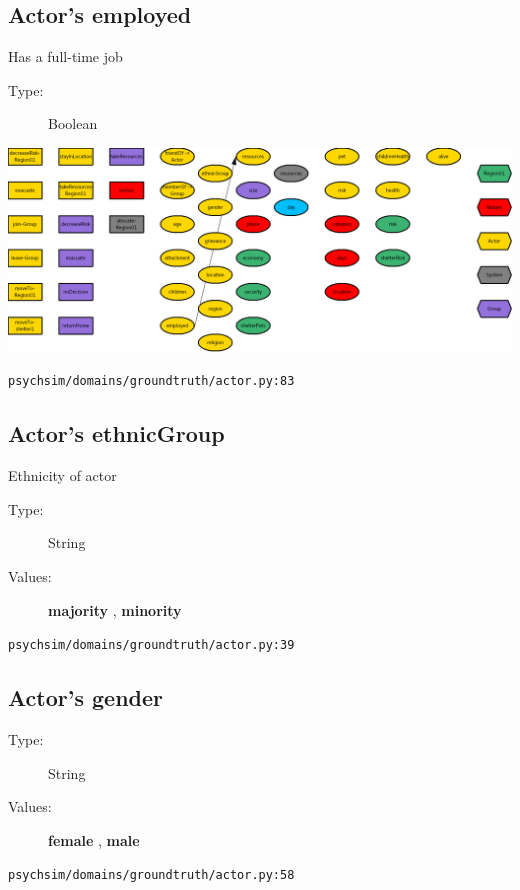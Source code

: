 \documentclass{article}%
\begin{document}
\subsection{Actor's employed}%
\label{subsec:Actor's employed}%
Has a full{-}time job%
\begin{description}%
\item[Type:]%
Boolean%
\end{description}%
\includegraphics[width=\textwidth]{images/employedOfActor.png}%
\begin{flushleft}%
\verb|psychsim/domains/groundtruth/actor.py:83|%
\end{flushleft}

%
\subsection{Actor's ethnicGroup}%
\label{subsec:Actor's ethnicGroup}%
Ethnicity of actor%
\begin{description}%
\item[Type:]%
String%
\item[Values:]%
\textbf{majority}%
, %
\textbf{minority}%
\end{description}%
\begin{flushleft}%
\verb|psychsim/domains/groundtruth/actor.py:39|%
\end{flushleft}

%
\subsection{Actor's gender}%
\label{subsec:Actor's gender}%
\begin{description}%
\item[Type:]%
String%
\item[Values:]%
\textbf{female}%
, %
\textbf{male}%
\end{description}%
\begin{flushleft}%
\verb|psychsim/domains/groundtruth/actor.py:58|%
\end{flushleft}
\end{document}
